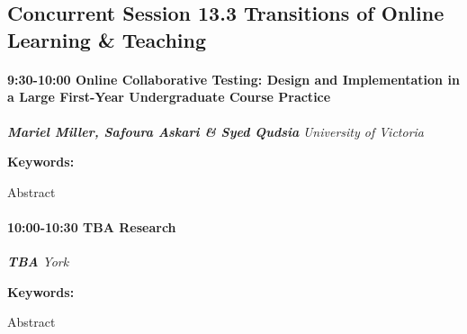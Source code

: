 \documentclass[
]{book}
\begin{document}
\hypertarget{concurrent-session-13.3-transitions-of-online-learning-teaching}{%
\subsection*{Concurrent Session 13.3 \textbar{} Transitions of Online Learning \& Teaching}\label{concurrent-session-13.3-transitions-of-online-learning-teaching}}

\begin{session}
\hypertarget{online-collaborative-testing-design-and-implementation-in-a-large-first-year-undergraduate-course-practice}{%
\paragraph*{\texorpdfstring{9:30-10:00 \textbar{} \textbf{Online
Collaborative Testing: Design and Implementation in a Large First-Year
Undergraduate Course} \textbar{}
Practice}{9:30-10:00 \textbar{} Online Collaborative Testing: Design and Implementation in a Large First-Year Undergraduate Course \textbar{} Practice}}\label{online-collaborative-testing-design-and-implementation-in-a-large-first-year-undergraduate-course-practice}}

\textbf{\emph{Mariel Miller, Safoura Askari \& Syed Qudsia}} \textbar{}
\emph{University of Victoria}

\textbf{Keywords:}

Abstract
\end{session}

\begin{session}
\hypertarget{tba-research}{%
\paragraph*{\texorpdfstring{10:00-10:30 \textbar{} \textbf{TBA}
\textbar{}
Research}{10:00-10:30 \textbar{} TBA \textbar{} Research}}\label{tba-research}}

\textbf{\emph{TBA}} \textbar{} \emph{York}

\textbf{Keywords:}

Abstract
\end{session}
\end{document}
